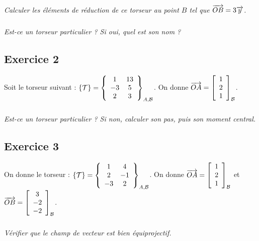 \documentclass[10pt,oneside]{article}
\begin{document}
\subparagraph{}
\textit{Calculer les éléments de réduction de ce torseur au point $B$ tel que $\vect{OB}=3\vect{y}$.}

\subparagraph{}
\textit{Est-ce un torseur particulier ? Si oui, quel est son nom ?}

\subsection*{Exercice 2}
\setcounter{subparagraph}{0}
Soit le torseur suivant :
$\torseur{\mathcal{T}} = \torseurcol{1}{-3}{2}{13}{5}{3}{A,\mathcal{B}}$. On donne $\vect{OA}=\left[\begin{array}{c} 1 \\ 2 \\ 1\end{array}\right]_{\mathcal{B}}$.

\subparagraph{}
\textit{Est-ce un torseur particulier ? Si non, calculer son pas, puis son moment central.}

\subsection*{Exercice 3}
\setcounter{subparagraph}{0}
On donne le torseur :
$\torseur{\mathcal{T}} = \torseurcol{1}{2}{-3}{4}{-1}{2}{A,\mathcal{B}}$. On donne $\vect{OA}=\left[\begin{array}{c} 1 \\ 2 \\ 1\end{array}\right]_{\mathcal{B}}$ et 
$\vect{OB}=\left[\begin{array}{c} 3 \\ -2 \\ -2\end{array}\right]_{\mathcal{B}}$.

\subparagraph{}
\textit{Vérifier que le champ de vecteur est bien équiprojectif.}
\end{document}
